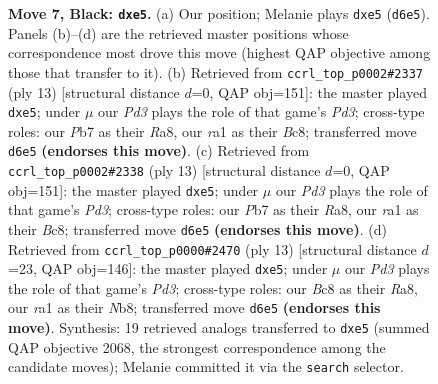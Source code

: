 \documentclass[11pt]{article}
\begin{document}
\begin{figure}[p]
\caption{\textbf{Move 7, Black: \texttt{dxe5}.} (a) Our position; Melanie plays \texttt{dxe5} (\texttt{d6e5}). Panels (b)--(d) are the retrieved master positions whose correspondence most drove this move (highest QAP objective among those that transfer to it). (b) Retrieved from \texttt{ccrl\_top\_p0002\#2337} (ply 13) [structural distance $d$=0, QAP obj=151]: the master played \texttt{dxe5}; under $\mu$ our \emph{Pd3} plays the role of that game's \emph{Pd3}; cross-type roles: our \emph{P}b7 as their \emph{R}a8, our \emph{r}a1 as their \emph{B}c8; transferred move \texttt{d6e5} \textbf{(endorses this move)}. (c) Retrieved from \texttt{ccrl\_top\_p0002\#2338} (ply 13) [structural distance $d$=0, QAP obj=151]: the master played \texttt{dxe5}; under $\mu$ our \emph{Pd3} plays the role of that game's \emph{Pd3}; cross-type roles: our \emph{P}b7 as their \emph{R}a8, our \emph{r}a1 as their \emph{B}c8; transferred move \texttt{d6e5} \textbf{(endorses this move)}. (d) Retrieved from \texttt{ccrl\_top\_p0000\#2470} (ply 13) [structural distance $d$=23, QAP obj=146]: the master played \texttt{dxe5}; under $\mu$ our \emph{Pd3} plays the role of that game's \emph{Pd3}; cross-type roles: our \emph{B}c8 as their \emph{R}a8, our \emph{r}a1 as their \emph{N}b8; transferred move \texttt{d6e5} \textbf{(endorses this move)}. Synthesis: 19 retrieved analogs transferred to \texttt{dxe5} (summed QAP objective 2068, the strongest correspondence among the candidate moves); Melanie committed it via the \texttt{search} selector.}
\label{fig:thought-m13}
\end{figure}

\clearpage
\end{document}
